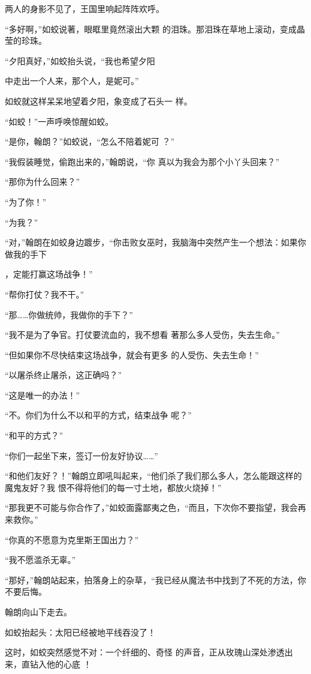 \documentclass{article}
\begin{document}
两人的身影不见了，王国里响起阵阵欢呼。 

“多好啊，”如蛟说著，眼眶里竟然滚出大颗
的泪珠。那泪珠在草地上滚动，变成晶莹的珍珠。 

“夕阳真好，”如蛟抬头说，“我也希望夕阳
\newpage

中走出一个人来，那个人，是妮可。” 

如蛟就这样呆呆地望着夕阳，象变成了石头一
样。 


“如蛟！”一声呼唤惊醒如蛟。 

“是你，翰朗？”如蛟说，“怎么不陪着妮可
？” 

“我假装睡觉，偷跑出来的，”翰朗说，“你
真以为我会为那个小丫头回来？” 


“那你为什么回来？” 


“为了你！” 


“为我？” 

“对，”翰朗在如蛟身边踱步，“你击败女巫时，我脑海中突然产生一个想法：如果你做我的手下
\newpage

，定能打赢这场战争！” 


“帮你打仗？我不干。” 


“那……你做统帅，我做你的手下？” 

“我不是为了争官。打仗要流血的，我不想看
著那么多人受伤，失去生命。” 

“但如果你不尽快结束这场战争，就会有更多
的人受伤、失去生命！” 


“以屠杀终止屠杀，这正确吗？” 


“这是唯一的办法！” 

“不。你们为什么不以和平的方式，结束战争
呢？” 


“和平的方式？” 

\newpage

“你们一起坐下来，签订一份友好协议……”

“和他们友好？！”翰朗立即吼叫起来，“他们杀了我们那么多人，怎么能跟这样的魔鬼友好？我
恨不得将他们的每一寸土地，都放火烧掉！” 

“那我更不可能与你合作了，”如蛟面露鄙夷之色，“而且，下次你不要指望，我会再来救你。”


“你真的不愿意为克里斯王国出力？” 


“我不愿滥杀无辜。” 

“那好，”翰朗站起来，拍落身上的杂草，“我已经从魔法书中找到了不死的方法，你不要后悔。


翰朗向山下走去。 


如蛟抬起头：太阳已经被地平线吞没了！ 

这时，如蛟突然感觉不对：一个纤细的、奇怪
\newpage
的声音，正从玫瑰山深处渗透出来，直钻入他的心底
！ 
\end{document}
